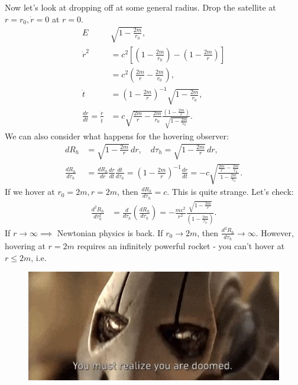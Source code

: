 \documentclass[a4paper, 11pt, normalem]{report}
\begin{document}
Now let's look at dropping off at some general radius. 
Drop the satellite at $r=r_0,\dot{r}=0$ at $r=0$.
\begin{align}
    E & \sqrt{1-\frac{2m}{r_0}},\\
    \dot{r}^2 &= c^2\left[\left(1-\frac{2m}{r_0}\right)-\left(1-\frac{2m}{r}\right)\right] \\
              &= c^2\left(\frac{2m}{r} - \frac{2m}{r_0}\right), \\
    \dot{t} &= \left(1-\frac{2m}{r}\right)^{-1}\sqrt{1-\frac{2m}{r_0}},\\
    \frac{dr}{dt} = \frac{\dot{r}}{\dot{t}} &= c\sqrt{\frac{2m}{r}-\frac{2m}{r_0}}\frac{\left(1-\frac{2m}{r}\right)}{\sqrt{1-\frac{2m}{r_0}}}.
\end{align}
We can also consider what happens for the hovering observer:
\begin{align}
    dR_h &= \sqrt{1-\frac{2m}{r}}\,dr,\quad  d\tau_h = \sqrt{1-\frac{2m}{r}}\,dr, \\
    \frac{dR_h}{d\tau_h} &= \frac{dR_h}{dr}\frac{dr}{dt}\frac{dt}{d\tau_h} = \left(1-\frac{2m}{r}\right)^{-1}\frac{dr}{dt} = -c\sqrt{\frac{\frac{2m}{r}-\frac{2m}{r_0}}{1-\frac{2m}{r_0}}}.
\end{align}
If we hover at $r_0=2m,r=2m$, then $\frac{dR_h}{d\tau_h}=c$. 
This is quite strange. 
Let's check:
\begin{align}
    \frac{d^2R_h}{d\tau_h^2} &= \frac{d}{d\tau_h}\left(\frac{dR_h}{d\tau_h}\right) = -\frac{mc^2}{r^2}\frac{\sqrt{1-\frac{2m}{r}}}{\left(1-\frac{2m}{r_0}\right)}.
\end{align}
If $r\to\infty\implies$ Newtonian physics is back. 
If $r_0\to2m$, then $\frac{d^2R_h}{d\tau_h}\to\infty$.
However, hovering at $r=2m$ requires an infinitely powerful rocket - you can't hover at $r\leq2m$, i.e. 
\begin{figure}[H]
    \centering
    \includegraphics[scale=0.7]{gg.jpg}
\end{figure}
\end{document}
